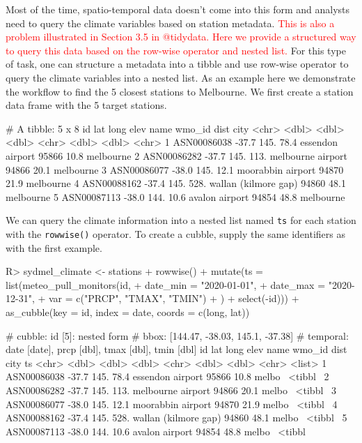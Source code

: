 \documentclass[
]{jss}
\begin{document}
Most of the time, spatio-temporal data doesn't come into this form and
analysts need to query the climate variables based on station metadata.
\textcolor{red}{This is also a problem illustrated in Section 3.5 in @tidydata. Here we provide a structured way to query this data based on the row-wise operator and nested list.}
For this type of task, one can structure a metadata into a tibble and
use row-wise operator to query the climate variables into a nested list.
As an example here we demonstrate the workflow to find the 5 closest
stations to Melbourne. We first create a station data frame with the 5
target stations.

\begin{CodeChunk}
\begin{CodeOutput}
# A tibble: 5 x 8
  id            lat  long  elev name                 wmo_id  dist city     
  <chr>       <dbl> <dbl> <dbl> <chr>                 <dbl> <dbl> <chr>    
1 ASN00086038 -37.7  145.  78.4 essendon airport      95866  10.8 melbourne
2 ASN00086282 -37.7  145. 113.  melbourne airport     94866  20.1 melbourne
3 ASN00086077 -38.0  145.  12.1 moorabbin airport     94870  21.9 melbourne
4 ASN00088162 -37.4  145. 528.  wallan (kilmore gap)  94860  48.1 melbourne
5 ASN00087113 -38.0  144.  10.6 avalon airport        94854  48.8 melbourne
\end{CodeOutput}
\end{CodeChunk}

We can query the climate information into a nested list named
\texttt{ts} for each station with the \texttt{rowwise()} operator. To
create a cubble, supply the same identifiers as with the first example.

\begin{CodeChunk}
\begin{CodeInput}
R> sydmel_climate <- stations %
+   rowwise() %
+   mutate(ts = list(meteo_pull_monitors(id,
+     date_min = "2020-01-01",
+     date_max = "2020-12-31",
+     var = c("PRCP", "TMAX", "TMIN")
+   ) %
+     select(-id))) %
+   as_cubble(key = id, index = date, coords = c(long, lat))
\end{CodeInput}
\end{CodeChunk}

\begin{CodeChunk}
\begin{CodeOutput}
# cubble:   id [5]: nested form
# bbox:     [144.47, -38.03, 145.1, -37.38]
# temporal: date [date], prcp [dbl], tmax [dbl], tmin [dbl]
  id            lat  long  elev name                 wmo_id  dist city   ts     
  <chr>       <dbl> <dbl> <dbl> <chr>                 <dbl> <dbl> <chr>  <list> 
1 ASN00086038 -37.7  145.  78.4 essendon airport      95866  10.8 melbo~ <tibbl~
2 ASN00086282 -37.7  145. 113.  melbourne airport     94866  20.1 melbo~ <tibbl~
3 ASN00086077 -38.0  145.  12.1 moorabbin airport     94870  21.9 melbo~ <tibbl~
4 ASN00088162 -37.4  145. 528.  wallan (kilmore gap)  94860  48.1 melbo~ <tibbl~
5 ASN00087113 -38.0  144.  10.6 avalon airport        94854  48.8 melbo~ <tibbl~
\end{CodeOutput}
\end{CodeChunk}
\end{document}
